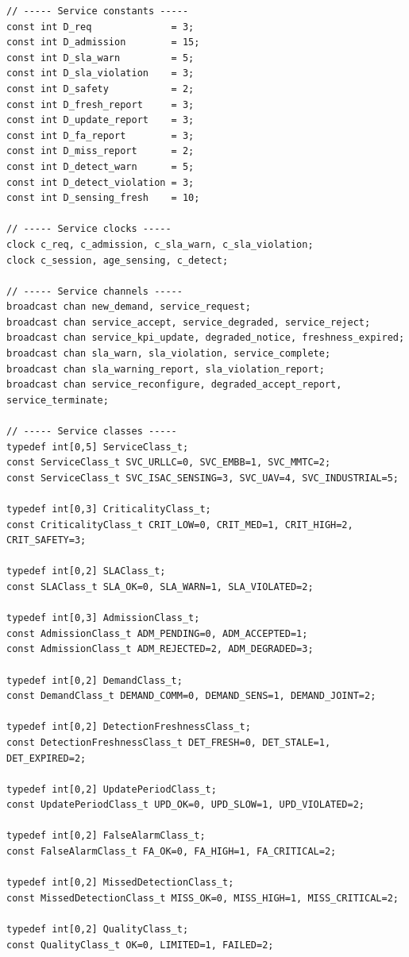 \documentclass[10pt,a4paper]{article}
\begin{document}
\begin{verbatim}
// ----- Service constants -----
const int D_req              = 3;
const int D_admission        = 15;
const int D_sla_warn         = 5;
const int D_sla_violation    = 3;
const int D_safety           = 2;
const int D_fresh_report     = 3;
const int D_update_report    = 3;
const int D_fa_report        = 3;
const int D_miss_report      = 2;
const int D_detect_warn      = 5;
const int D_detect_violation = 3;
const int D_sensing_fresh    = 10;

// ----- Service clocks -----
clock c_req, c_admission, c_sla_warn, c_sla_violation;
clock c_session, age_sensing, c_detect;

// ----- Service channels -----
broadcast chan new_demand, service_request;
broadcast chan service_accept, service_degraded, service_reject;
broadcast chan service_kpi_update, degraded_notice, freshness_expired;
broadcast chan sla_warn, sla_violation, service_complete;
broadcast chan sla_warning_report, sla_violation_report;
broadcast chan service_reconfigure, degraded_accept_report, service_terminate;

// ----- Service classes -----
typedef int[0,5] ServiceClass_t;
const ServiceClass_t SVC_URLLC=0, SVC_EMBB=1, SVC_MMTC=2;
const ServiceClass_t SVC_ISAC_SENSING=3, SVC_UAV=4, SVC_INDUSTRIAL=5;

typedef int[0,3] CriticalityClass_t;
const CriticalityClass_t CRIT_LOW=0, CRIT_MED=1, CRIT_HIGH=2, CRIT_SAFETY=3;

typedef int[0,2] SLAClass_t;
const SLAClass_t SLA_OK=0, SLA_WARN=1, SLA_VIOLATED=2;

typedef int[0,3] AdmissionClass_t;
const AdmissionClass_t ADM_PENDING=0, ADM_ACCEPTED=1;
const AdmissionClass_t ADM_REJECTED=2, ADM_DEGRADED=3;

typedef int[0,2] DemandClass_t;
const DemandClass_t DEMAND_COMM=0, DEMAND_SENS=1, DEMAND_JOINT=2;

typedef int[0,2] DetectionFreshnessClass_t;
const DetectionFreshnessClass_t DET_FRESH=0, DET_STALE=1, DET_EXPIRED=2;

typedef int[0,2] UpdatePeriodClass_t;
const UpdatePeriodClass_t UPD_OK=0, UPD_SLOW=1, UPD_VIOLATED=2;

typedef int[0,2] FalseAlarmClass_t;
const FalseAlarmClass_t FA_OK=0, FA_HIGH=1, FA_CRITICAL=2;

typedef int[0,2] MissedDetectionClass_t;
const MissedDetectionClass_t MISS_OK=0, MISS_HIGH=1, MISS_CRITICAL=2;

typedef int[0,2] QualityClass_t;
const QualityClass_t OK=0, LIMITED=1, FAILED=2;


\end{verbatim}
\end{document}
